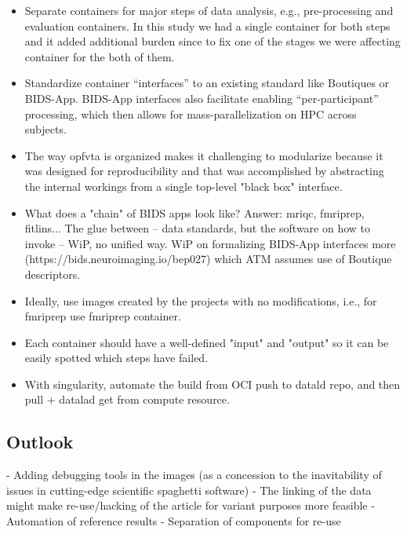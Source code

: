 \begin{itemize}
    \item
      Separate containers for major steps of data analysis, e.g., pre-processing and evaluation containers.
      In this study we had a single container for both steps and it added additional burden since to fix one of the stages we were affecting container for the both of them. 
    \item
      Standardize container ``interfaces'' to an existing standard like Boutiques or BIDS-App.
      BIDS-App interfaces also facilitate enabling ``per-participant'' processing, which then allows for mass-parallelization on HPC across subjects.
    \item
      The way opfvta is organized makes it challenging to modularize because it was designed for reproducibility and that was accomplished by abstracting the internal workings from a single top-level "black box" interface.
      \item What does a "chain" of BIDS apps look like?  Answer: mriqc, fmriprep, fitlins... The glue between -- data standards, but the software on how to invoke -- WiP, no unified way. WiP on formalizing BIDS-App interfaces more (https://bids.neuroimaging.io/bep027) which ATM assumes use of Boutique descriptors.
      \item Ideally, use images created by the projects with no modifications, i.e., for fmriprep use fmriprep container.
      \item Each container should have a well-defined "input" and "output" so it can be easily spotted which steps have failed.
  \item With singularity, automate the build from OCI push to datald repo, and then pull + datalad get from compute resource.
\end{itemize}



%
%
%

\subsection{Outlook}
- Adding debugging tools in the images (as a concession to the inavitability of issues in cutting-edge scientific spaghetti software)
- The linking of the data might make re-use/hacking of the article for variant purposes more feasible
- Automation of reference results
- Separation of components for re-use
